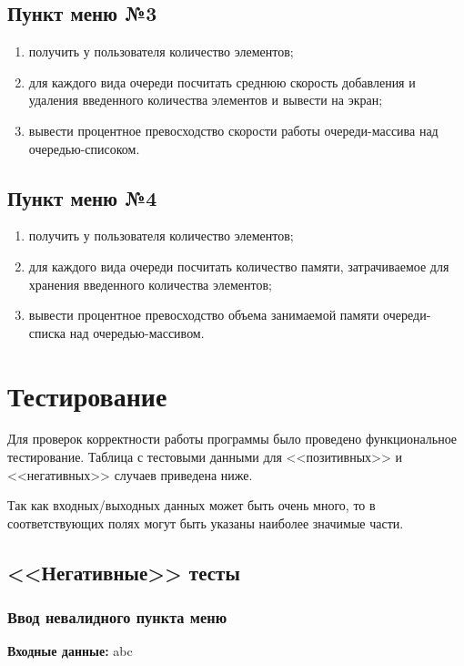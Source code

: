 \documentclass[a4paper,12pt]{extarticle}
\begin{document}
\subsection{Пункт меню №3}
\begin{enumerate}
    \item получить у пользователя количество элементов;
    \item для каждого вида очереди посчитать среднюю скорость добавления и удаления введенного количества элементов и вывести на экран;
    \item вывести процентное превосходство скорости работы очереди-массива над очередью-списоком.
\end{enumerate}

\subsection{Пункт меню №4}
\begin{enumerate}
    \item получить у пользователя количество элементов;
    \item для каждого вида очереди посчитать количество памяти, затрачиваемое для хранения введенного количества элементов;
    \item вывести процентное превосходство объема занимаемой памяти очереди-списка над очередью-массивом.
\end{enumerate}

\newpage

\section{Тестирование}
Для проверок корректности работы программы было проведено функциональное тестирование. Таблица с тестовыми данными для <<позитивных>> и <<негативных>> случаев приведена ниже.

Так как входных/выходных данных может быть очень много, то в соответствующих полях могут быть указаны наиболее значимые части.

\subsection{<<Негативные>> тесты}
\subsubsection{Ввод невалидного пункта меню}

\textbf{Входные данные: }
abc
\end{document}
